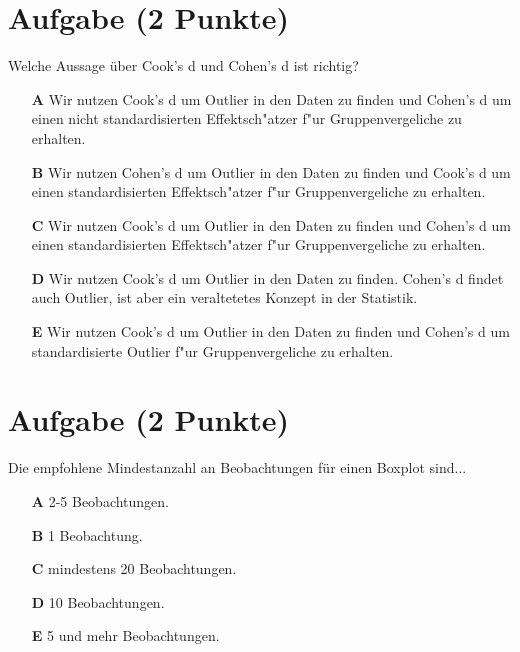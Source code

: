 \documentclass[a4paper, 10pt]{scrartcl}\usepackage[]{graphicx}\usepackage[]{xcolor}
\begin{document}
\section{Aufgabe \hfill (2 Punkte)}

Welche Aussage {\"u}ber Cook's d und Cohen's d ist richtig? 



\begin{enumerate}
\item [\textbf{A} \msquare] Wir nutzen Cook's d um Outlier in den Daten zu finden und Cohen's d um einen nicht standardisierten Effektsch{"a}tzer f{"u}r Gruppenvergeliche zu erhalten.
\item [\textbf{B} \msquare] Wir nutzen Cohen's d um Outlier in den Daten zu finden und Cook's d um einen standardisierten Effektsch{"a}tzer f{"u}r Gruppenvergeliche zu erhalten.
\item [\textbf{C} \msquare] Wir nutzen Cook's d um Outlier in den Daten zu finden und Cohen's d um einen standardisierten Effektsch{"a}tzer f{"u}r Gruppenvergeliche zu erhalten.
\item [\textbf{D} \msquare] Wir nutzen Cook's d um Outlier in den Daten zu finden. Cohen's d findet auch Outlier, ist aber ein veraltetetes Konzept in der Statistik.
\item [\textbf{E} \msquare] Wir nutzen Cook's d um Outlier in den Daten zu finden und Cohen's d um standardisierte Outlier f{"u}r Gruppenvergeliche zu erhalten.
\end{enumerate} 

\section{Aufgabe \hfill (2 Punkte)}



Die empfohlene Mindestanzahl an Beobachtungen f{\"u}r einen Boxplot sind...



\begin{enumerate}
\item [\textbf{A} \msquare] 2-5 Beobachtungen.
\item [\textbf{B} \msquare] 1 Beobachtung.
\item [\textbf{C} \msquare] mindestens 20 Beobachtungen.
\item [\textbf{D} \msquare] 10 Beobachtungen.
\item [\textbf{E} \msquare] 5 und mehr Beobachtungen.
\end{enumerate} 
\end{document}
